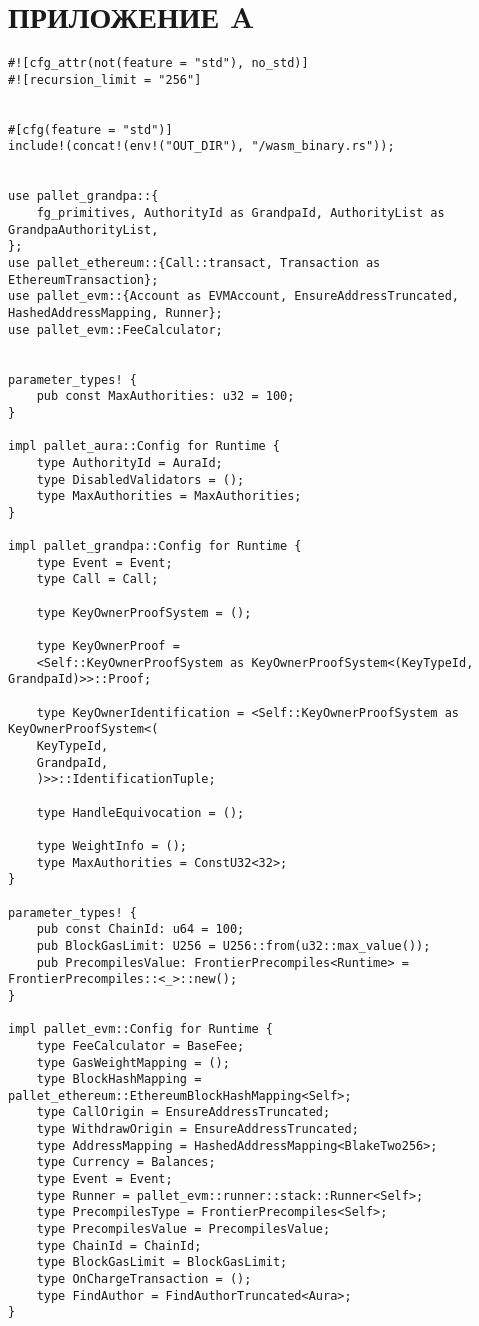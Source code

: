 \section*{ПРИЛОЖЕНИЕ A}






\begin{lstlisting}[caption=Конфигурация узла сети блокчейн-сети, label = list1, style=realcode]
#![cfg_attr(not(feature = "std"), no_std)]
#![recursion_limit = "256"]


#[cfg(feature = "std")]
include!(concat!(env!("OUT_DIR"), "/wasm_binary.rs"));


use pallet_grandpa::{
	fg_primitives, AuthorityId as GrandpaId, AuthorityList as GrandpaAuthorityList,
};
use pallet_ethereum::{Call::transact, Transaction as EthereumTransaction};
use pallet_evm::{Account as EVMAccount, EnsureAddressTruncated, HashedAddressMapping, Runner};
use pallet_evm::FeeCalculator;


parameter_types! {
	pub const MaxAuthorities: u32 = 100;
}

impl pallet_aura::Config for Runtime {
	type AuthorityId = AuraId;
	type DisabledValidators = ();
	type MaxAuthorities = MaxAuthorities;
}

impl pallet_grandpa::Config for Runtime {
	type Event = Event;
	type Call = Call;
	
	type KeyOwnerProofSystem = ();
	
	type KeyOwnerProof =
	<Self::KeyOwnerProofSystem as KeyOwnerProofSystem<(KeyTypeId, GrandpaId)>>::Proof;
	
	type KeyOwnerIdentification = <Self::KeyOwnerProofSystem as KeyOwnerProofSystem<(
	KeyTypeId,
	GrandpaId,
	)>>::IdentificationTuple;
	
	type HandleEquivocation = ();
	
	type WeightInfo = ();
	type MaxAuthorities = ConstU32<32>;
}

parameter_types! {
	pub const ChainId: u64 = 100;
	pub BlockGasLimit: U256 = U256::from(u32::max_value());
	pub PrecompilesValue: FrontierPrecompiles<Runtime> = FrontierPrecompiles::<_>::new();
}

impl pallet_evm::Config for Runtime {
	type FeeCalculator = BaseFee;
	type GasWeightMapping = ();
	type BlockHashMapping = pallet_ethereum::EthereumBlockHashMapping<Self>;
	type CallOrigin = EnsureAddressTruncated;
	type WithdrawOrigin = EnsureAddressTruncated;
	type AddressMapping = HashedAddressMapping<BlakeTwo256>;
	type Currency = Balances;
	type Event = Event;
	type Runner = pallet_evm::runner::stack::Runner<Self>;
	type PrecompilesType = FrontierPrecompiles<Self>;
	type PrecompilesValue = PrecompilesValue;
	type ChainId = ChainId;
	type BlockGasLimit = BlockGasLimit;
	type OnChargeTransaction = ();
	type FindAuthor = FindAuthorTruncated<Aura>;
}


\end{lstlisting}

